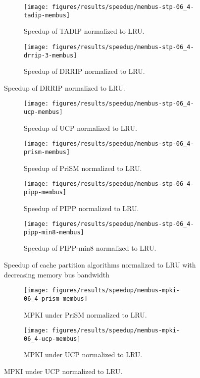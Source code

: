 \begin{figure}[!htb]
    \centering
    \begin{subfigure}[b]{0.5\textwidth}
        \texttt{[image: figures/results/speedup/membus-stp-06\_4-tadip-membus]}
        \caption{Speedup of TADIP normalized to LRU.}
        \label{fig:results:bus:tadip}
    \end{subfigure}%
    \begin{subfigure}[b]{0.5\textwidth}
        \texttt{[image: figures/results/speedup/membus-stp-06\_4-drrip-3-membus]}
        \caption{Speedup of DRRIP normalized to LRU.}
        \label{fig:results:bus:drrip}
    \end{subfigure}
\end{figure}
\clearpage
\begin{figure}[!htb]
    \ContinuedFloat
    \begin{subfigure}[b]{0.5\textwidth}
        \texttt{[image: figures/results/speedup/membus-stp-06\_4-ucp-membus]}
        \caption{Speedup of UCP normalized to LRU.}
        \label{fig:results:bus:ucp}
    \end{subfigure}%
    \begin{subfigure}[b]{0.5\textwidth}
        \texttt{[image: figures/results/speedup/membus-stp-06\_4-prism-membus]}
        \caption{Speedup of PriSM normalized to LRU.}
        \label{fig:results:bus:prism}
    \end{subfigure}
    \begin{subfigure}[b]{0.5\textwidth}
        \texttt{[image: figures/results/speedup/membus-stp-06\_4-pipp-membus]}
        \caption{Speedup of PIPP normalized to LRU.}
        \label{fig:results:bus:pipp}
    \end{subfigure}%
    \begin{subfigure}[b]{0.5\textwidth}
        \texttt{[image: figures/results/speedup/membus-stp-06\_4-pipp-min8-membus]}
        \caption{Speedup of PIPP-min8 normalized to LRU.}
        \label{fig:results:bus:pipp-min8}
    \end{subfigure}
    \caption{Speedup of cache partition algorithms normalized to LRU with decreasing memory bus bandwidth}
    \label{fig:results:bus}
\end{figure}

\begin{figure}[!htb]
    \centering
    \begin{subfigure}[b]{0.5\textwidth}
        \texttt{[image: figures/results/speedup/membus-mpki-06\_4-prism-membus]}
        \caption{MPKI under PriSM normalized to LRU.}
        \label{fig:results:membus:mpki-prism}
    \end{subfigure}%
    \begin{subfigure}[b]{0.5\textwidth}
        \texttt{[image: figures/results/speedup/membus-mpki-06\_4-ucp-membus]}
        \caption{MPKI under UCP normalized to LRU.}
        \label{fig:results:membus:mpki-ucp}
    \end{subfigure}
\end{figure}

